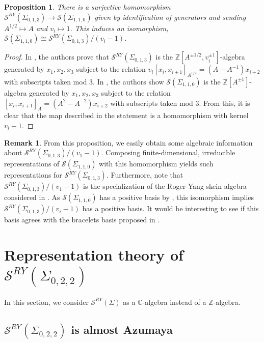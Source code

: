 \documentclass{article}
\newcommand{\C}{\mathbb{C}}
\newcommand{\Z}{\mathbb{Z}}
\renewcommand{\S}{\mathcal{S}}
\newcommand{\SRY}{\mathcal{S}^{RY}}
\newtheorem{proposition}[theorem]{Proposition}
\theoremstyle{definition}
\newtheorem{remark}[theorem]{Remark}
\renewcommand{\SRY}{\ensuremath{ \mathcal S^{RY}}}
\begin{document}
\begin{proposition}
    There is a surjective homomorphism  $\SRY(\Sigma_{0,1,3})\to \S(\Sigma_{1,1,0})$ given by identification of generators and sending $A^{1/2}\mapsto A$ and $v_i\mapsto1$. This induces an isomorphism, $ \S(\Sigma_{1,1,0})\cong \SRY(\Sigma_{0,1,3})/(v_i-1)$.
\end{proposition}
\begin{proof}
	In \cite[Theorem~1.1]{MoonPuncSph}, the authors prove that $\SRY(\Sigma_{0,1,3})$ is the $\Z[A^{\pm1/2},v_i^{\pm1}]$-algebra generated by $x_1,x_2,x_3$ subject to the relation $v_i[x_i,x_{i+1}]_{A^{1/2}}=(A-A^{-1})x_{i+2}$ with subscripts taken mod 3. In \cite[Theorem~2.1]{BullockPrz}, the authors show $\S(\Sigma_{1,1,0})$ is the $\Z[A^{\pm1}]$-algebra generated by $x_1,x_2,x_3$ subject to the relation $ [x_i,x_{i+1}]_{A}=(A^2-A^{-2})x_{i+2}$ with subscripts taken mod 3. From this, it is clear that the map described in the statement is a homomorphism with kernel $v_i-1$.
\end{proof}

\begin{remark}
From this proposition, we easily obtain some algebraic information about $\SRY(\Sigma_{0,1,3})/(v_1-1)$. Composing finite-dimensional, irreducible representations of $\S(\Sigma_{1,1,0})$ with this homomorphism yields such representations for $\SRY(\Sigma_{0,1,3})$. Furthermore, note that $\SRY(\Sigma_{0,1,3})/(v_1-1)$ is the specialization of the Roger-Yang skein algebra considered in \cite{KaruoPositive}. As $\S(\Sigma_{1,1,0})$ has a positive basis by \cite{BousseauPositive,MandelQinPositive}, this isomorphism implies $\SRY(\Sigma_{0,1,3})/(v_i-1)$ has a positive basis. It would be interesting to see if this basis agrees with the bracelets basis proposed in \cite{KaruoPositive}.
\end{remark}


\section{Representation theory of $\S^{RY}(\Sigma_{0,2,2})$}  \label{sec:reps}

In this section, we consider $\SRY(\Sigma)$ as a $\C$-algebra instead of a $\Z$-algebra.

\subsection{  $\S^{RY}(\Sigma_{0,2,2})$ is almost Azumaya}
\end{document}
